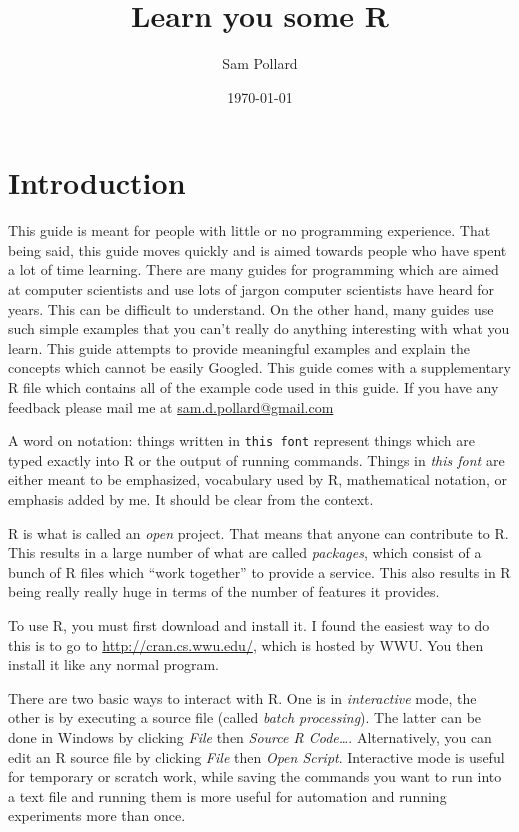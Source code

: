 \documentclass[12pt]{article}
\begin{document}
\title{Learn you some R}
\author{Sam Pollard}
\date{\today}
\maketitle

\section{Introduction}

This guide is meant for people with little or no programming experience. That being said, this guide moves quickly and is aimed towards people who have spent a lot of time learning. There are many guides for programming which are aimed at computer scientists and use lots of jargon computer scientists have heard for years. This can be difficult to understand. On the other hand, many guides use such simple examples that you can't really do anything interesting with what you learn. This guide attempts to provide meaningful examples and explain the concepts which cannot be easily Googled. This guide comes with a supplementary R file which contains all of the example code used in this guide. If you have any feedback please mail me at \url{sam.d.pollard@gmail.com}

A word on notation: things written in \verb|this font| represent things which are typed exactly into R or the output of running commands. Things in \emph{this font} are either meant to be emphasized, vocabulary used by R, mathematical notation, or emphasis added by me. It should be clear from the context.

R is what is called an \emph{open} project. That means that anyone can contribute to R. This results in a large number of what are called \emph{packages}, which consist of a bunch of R files which ``work together'' to provide a service. This also results in R being really really huge in terms of the number of features it provides.

To use R, you must first download and install it. I found the easiest way to do this is to go to \url{http://cran.cs.wwu.edu/}, which is hosted by WWU. You then install it like any normal program.

There are two basic ways to interact with R. One is in \emph{interactive} mode, the other is by executing a source file (called \emph{batch processing}). The latter can be done in Windows by clicking \emph{File} then \emph{Source R Code\dots}. Alternatively, you can edit an R source file by clicking \emph{File} then \emph{Open Script}. Interactive mode is useful for temporary or scratch work, while saving the commands you want to run into a text file and running them is more useful for automation and running experiments more than once.
\end{document}
